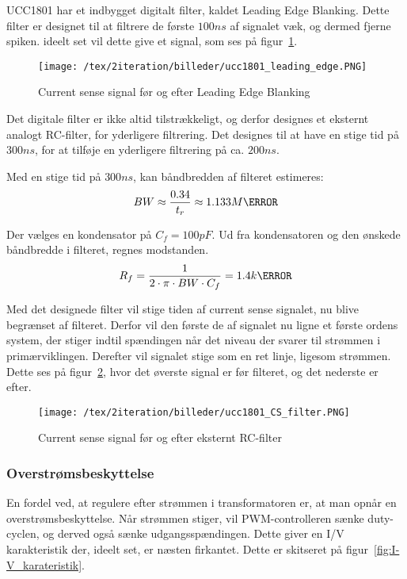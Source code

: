 UCC1801 har et indbygget digitalt filter, kaldet Leading Edge Blanking. Dette filter er designet til at filtrere de første $100ns$ af signalet væk, og dermed fjerne spiken. ideelt set vil dette give et signal, som ses på figur~\ref{fig:ucc1801_leading_edge}.

\begin{figure}[H]
	\center
	\texttt{[image: /tex/2iteration/billeder/ucc1801\_leading\_edge.PNG]}
	\caption{Current sense signal før og efter Leading Edge Blanking}
	\label{fig:ucc1801_leading_edge}
\end{figure}

Det digitale filter er ikke altid tilstrækkeligt, og derfor designes et eksternt analogt RC-filter, for yderligere filtrering. Det designes til at have en stige tid på $300ns$, for at tilføje en yderligere filtrering på ca. $200ns$. 

Med en stige tid på $300ns$, kan båndbredden af filteret estimeres:
\begin{equation} \label{filter_BW}
BW \approx \frac{0.34}{t_r} \approx 1.133M\hertz
\end{equation}

\noindent Der vælges en kondensator på $C_f=100pF$. Ud fra kondensatoren og den ønskede båndbredde i filteret, regnes modstanden.
\begin{equation} \label{filter_R}
R_f = \frac{1}{2 \cdot \pi \cdot BW \cdot C_f} = 1.4k\ohm
\end{equation}

Med det designede filter vil stige tiden af current sense signalet, nu blive begrænset af filteret. Derfor vil den første de af signalet nu ligne et første ordens system, der stiger indtil spændingen når det niveau der svarer til strømmen i primærviklingen. Derefter vil signalet stige som en ret linje, ligesom strømmen. Dette ses på figur~\ref{fig:ucc1801_CS_filter}, hvor det øverste signal er før filteret, og det nederste er efter.

\begin{figure}[H]
	\center
	\texttt{[image: /tex/2iteration/billeder/ucc1801\_CS\_filter.PNG]}
	\caption{Current sense signal før og efter eksternt RC-filter}
	\label{fig:ucc1801_CS_filter}
\end{figure}

\subsubsection{Overstrømsbeskyttelse}
En fordel ved, at regulere efter strømmen i transformatoren er, at man opnår en overstrømsbeskyttelse. Når strømmen stiger, vil PWM-controlleren sænke duty-cyclen, og derved også sænke udgangsspændingen. Dette giver en I/V karakteristik der, ideelt set, er næsten firkantet. Dette er skitseret på figur~\ref{fig:I-V_karateristik}. 

